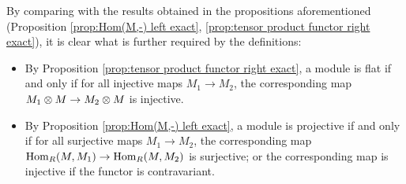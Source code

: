 \documentclass{article}
\begin{document}
\begin{remark}\label{rmk:diff def for projective module}
    By comparing with the results obtained in the propositions aforementioned (Proposition \ref{prop:Hom(M,-) left exact}, \ref{prop:tensor product functor right exact}), it is clear what is further required by the definitions:
    \begin{itemize}
        \item By Proposition \ref{prop:tensor product functor right exact}, a module is flat if and only if for all injective maps $M_1 \to M_2$, the corresponding map \\ $M_1 \otimes M \to M_2 \otimes M$ is injective.
        \item By Proposition \ref{prop:Hom(M,-) left exact}, a module is projective if and only if for all surjective maps $M_1 \to M_2$, the corresponding map \\ $\mathrm{Hom}_R(M, M_1) \to \mathrm{Hom}_R(M, M_2)$ is surjective; or the corresponding map is injective if the functor is contravariant.
    \end{itemize}
\end{remark}
\end{document}

